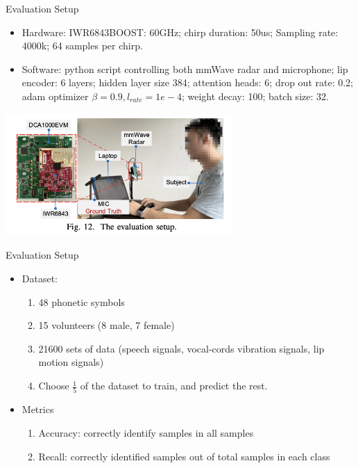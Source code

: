 \documentclass[dvipsnames, handout]{beamer}
\newcommand{\1}{\mathds{1}}	%
\begin{document}
\begin{frame}[t]{Evaluation Setup}
\begin{itemize}
\item Hardware: IWR6843BOOST: 60GHz; chirp duration: 50us; Sampling rate: 4000k; 64 samples per chirp.

\item Software: python script controlling both mmWave radar and microphone; lip encoder: 6 layers; hidden layer size 384; attention heads: 6; drop out rate: 0.2; adam optimizer $\beta=0.9, l_{rate}=1e-4$; weight decay: 100; batch size: 32.
\end{itemize}

\begin{center}
\includegraphics[width=0.65\textwidth]{imgs/mmmic-fig12.png}
\end{center}




\end{frame}



\begin{frame}[t]{Evaluation Setup}
\begin{itemize}
\item Dataset: 
\begin{enumerate}
\item 48 phonetic symbols
\item 15 volunteers (8 male, 7 female)
\item 21600 sets of data (speech signals, vocal-cords vibration signals, lip motion signals)
\item Choose $\frac{1}{5}$ of the dataset to train, and predict the rest.
\end{enumerate}
\item Metrics
\begin{enumerate}
\item Accuracy: correctly identify samples in all samples
\item Recall: correctly identified samples out of total samples in each class
\end{enumerate}
\end{itemize}


\end{frame}
\end{document}

